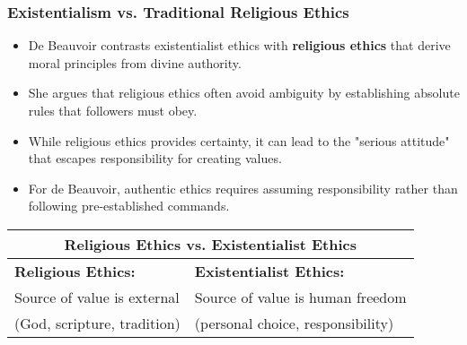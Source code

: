 \documentclass[aspectratio=169]{beamer}
\begin{document}
	\begin{frame}
		\frametitle{Existentialism vs. Traditional Religious Ethics}
		\begin{itemize}
			\item De Beauvoir contrasts existentialist ethics with \textbf{religious ethics} that derive moral principles from divine authority.
			\item She argues that religious ethics often avoid ambiguity by establishing absolute rules that followers must obey.
			\item While religious ethics provides certainty, it can lead to the "serious attitude" that escapes responsibility for creating values.
			\item For de Beauvoir, authentic ethics requires assuming responsibility rather than following pre-established commands.
		\end{itemize}
		
		\begin{table}
			\begin{tabular}{|p{5.5cm}|p{5.5cm}|}
				\hline
				\multicolumn{2}{|c|}{\textbf{Religious Ethics vs. Existentialist Ethics}} \\
				\hline
				\textbf{Religious Ethics:} & \textbf{Existentialist Ethics:} \\
				Source of value is external & Source of value is human freedom \\
				(God, scripture, tradition) & (personal choice, responsibility) \\
				\hline
			\end{tabular}
		\end{table}
	\end{frame}
	
\end{document}
